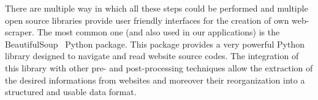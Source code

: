 \documentclass{standalone}
\begin{document}
There are multiple way in which all these steps could be performed and multiple open source libraries provide user friendly interfaces for the creation of own web-scraper.
The most common one (and also used in our applications) is the \textsf{BeautifulSoup}~\cite{richardson2007beautiful} \textsf{Python} package.
This package provides a very powerful \textsf{Python} library designed to navigate and read website source codes.
The integration of this library with other pre- and post-processing techniques allow the extraction of the desired informations from websites and moreover their reorganization into a structured and usable data format.
\end{document}
